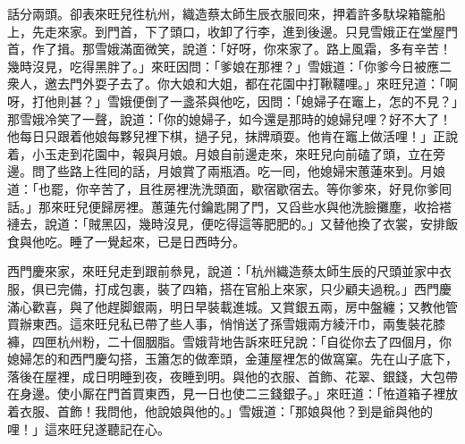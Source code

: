 話分兩頭。卻表來旺兒徃杭州，織造蔡太師生辰衣服囘來，押着許多馱垜箱籠船上，先走來家。到門首，下了頭口，收卸了行李，進到後邊。只見雪娥正在堂屋門首，作了揖。那雪娥滿面微笑，{}說道：「好呀，你來家了。{}路上風霜，多有辛苦！幾時沒見，吃得黑胖了。」來旺因問：「爹娘在那裡？」雪娥道：「你爹今日被應二衆人，邀去門外耍子去了。你大娘和大姐，都在花園中打鞦韆哩。」來旺兒道：「啊呀，打他則甚？」雪娥便倒了一盞茶與他吃，因問：「媳婦子在竈上，怎的不見？」那雪娥冷笑了一聲，說道：「你的媳婦子，如今還是那時的媳婦兒哩？好不大了！他每日只跟着他娘每夥兒裡下棋，撾子兒，抹牌頑耍。他肯在竈上做活哩！」正說着，小玉走到花園中，報與月娘。月娘自前邊走來，來旺兒向前磕了頭，立在旁邊。問了些路上徃囘的話，月娘賞了兩瓶酒。吃一囘，他媳婦宋蕙蓮來到。月娘道：「也罷，你辛苦了，且徃房裡洗洗頭面，歇宿歇宿去。等你爹來，好見你爹囘話。」那來旺兒便歸房裡。蕙蓮先付鑰匙開了門，又舀些水與他洗臉攤塵，收拾褡褳去，說道：「賊黑囚，幾時沒見，便吃得這等肥肥的。」又替他換了衣裳，安排飯食與他吃。睡了一覺起來，已是日西時分。

西門慶來家，來旺兒走到跟前叅見，說道：「杭州織造蔡太師生辰的尺頭並家中衣服，俱已完備，打成包裹，裝了四箱，搭在官船上來家，只少顧夫過稅。」西門慶滿心歡喜，與了他趕脚銀兩，明日早裝載進城。又賞銀五兩，房中盤纏；又教他管買辦東西。{}這來旺兒私已帶了些人事，悄悄送了孫雪娥兩方綾汗巾，兩隻裝花膝褲，四匣杭州粉，二十個胭脂。{}雪娥背地告訴來旺兒說：「自從你去了四個月，你媳婦怎的和西門慶勾搭，玉簫怎的做牽頭，金蓮屋裡怎的做窩窠。先在山子底下，落後在屋裡，成日明睡到夜，夜睡到明。與他的衣服、首飾、花翠、銀錢，大包帶在身邊。使小厮在門首買東西，見一日也使二三錢銀子。」來旺道：「恠道箱子裡放着衣服、首飾！我問他，他說娘與他的。」雪娥道：「那娘與他？到是爺與他的哩！」{}這來旺兒遂聽記在心。

